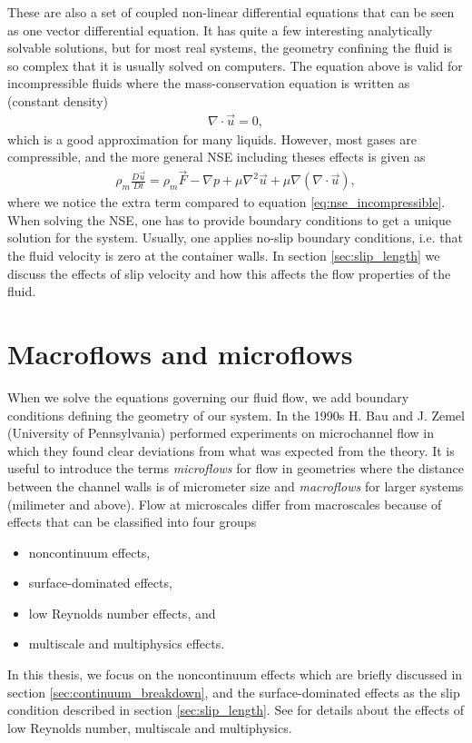 These are also a set of coupled non-linear differential equations that can be seen as one vector differential equation. It has quite a few interesting analytically solvable solutions, but for most real systems, the geometry confining the fluid is so complex that it is usually solved on computers. The equation above is valid for incompressible fluids where the mass-conservation equation is written as (constant density)
\begin{align}
	\nabla\cdot \vec u = 0,
\end{align}
which is a good approximation for many liquids. However, most gases are compressible, and the more general NSE including theses effects is given as
\begin{align}
	\rho_m \frac{D\vec u}{ Dt} = \rho_m \vec F - \nabla p + \mu\nabla^2\vec u + \mu\nabla(\nabla\cdot \vec u),
\end{align}
where we notice the extra term compared to equation \eqref{eq:nse_incompressible}. When solving the NSE, one has to provide boundary conditions to get a unique solution for the system. Usually, one applies no-slip boundary conditions, i.e. that the fluid velocity is zero at the container walls. In section \ref{sec:slip_length} we discuss the effects of slip velocity and how this affects the flow properties of the fluid. 

\section{Macroflows and microflows}
\label{sec:theory_of_fluids_microflows}
When we solve the equations governing our fluid flow, we add boundary conditions defining the geometry of our system. In the 1990s H. Bau and J. Zemel (University of Pennsylvania) performed experiments on microchannel flow in which they found clear deviations from what was expected from the theory\cite{karniadakis2005microflows}. It is useful to introduce the terms \textit{microflows} for flow in geometries where the distance between the channel walls is of micrometer size and \textit{macroflows} for larger systems (milimeter and above). Flow at microscales differ from macroscales because of effects that can be classified into four groups
\begin{itemize}
\item noncontinuum effects,
\item surface-dominated effects,
\item low Reynolds number effects, and
\item multiscale and multiphysics effects.
\end{itemize}
In this thesis, we focus on the noncontinuum effects which are briefly discussed in section \ref{sec:continuum_breakdown}, and the surface-dominated effects as the slip condition described in section \ref{sec:slip_length}. See \cite{karniadakis2005microflows} for details about the effects of low Reynolds number, multiscale and multiphysics. 

